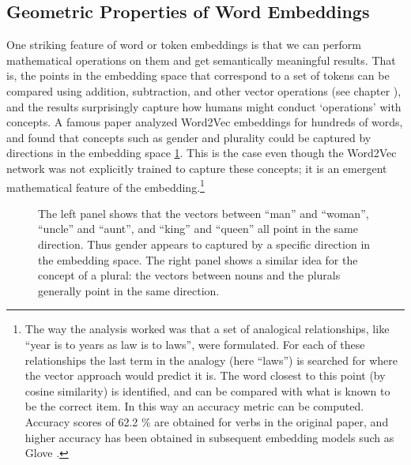 \subsection{Geometric Properties of Word Embeddings}\label{geometryWordEmbeddings}

One striking feature of word or token embeddings is that we can perform mathematical operations on them and get semantically meaningful results. That is, the points in the embedding space that correspond to a set of tokens can be compared using addition, subtraction, and other vector operations (see chapter ), and the results surprisingly capture how humans might conduct `operations' with concepts.  A famous paper \cite{mikolov2013linguistic} analyzed Word2Vec embeddings for hundreds of words, and found that concepts such as gender and plurality could be captured by directions in the embedding space \ref{geometryWordEmbedding}. This is the case even though the Word2Vec network was not explicitly trained to capture these concepts; it is an emergent mathematical feature of the embedding.\footnote{The way the analysis worked was that a set of analogical relationships, like ``year is to years as law is to laws'', were formulated.  For each of these relationships the last term in the analogy (here ``laws'') is searched for where the vector approach would predict it is. The word closest to this point (by cosine similarity) is identified, and can be compared with what is known to be the correct item. In this way an accuracy metric can be computed.  Accuracy scores of 62.2 \% are obtained for verbs in the original paper, and higher accuracy has been obtained in subsequent embedding models such as Glove \cite{pennington2014glove}.}

\begin{figure}[h]
\centering
{}
\caption[From \cite{mikolov2013linguistic}.]{The left panel shows that the vectors between ``man'' and ``woman'', ``uncle'' and ``aunt'', and ``king'' and ``queen'' all point in the same direction. Thus gender appears to captured by a specific direction in the embedding space. The right panel shows a similar idea for the concept of a plural: the vectors between nouns and the plurals generally point in the same direction.}
\label{geometryWordEmbedding}
\end{figure}

